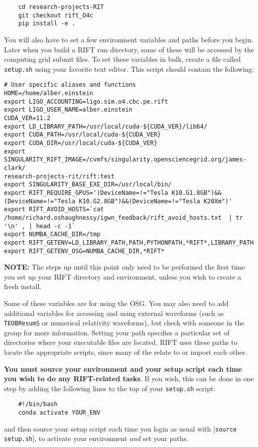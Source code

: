 \documentclass{article}
\begin{document}
\begin{verbatim}
    cd research-projects-RIT
    git checkout rift_O4c
    pip install -e .
\end{verbatim}

You will also have to set a few environment variables and paths before you begin. Later when you build a RIFT run directory, some of these will be accessed by the computing grid submit files. To set these variables in bulk, create a file called \texttt{setup.sh} using your favorite text editor. This script should contain the following:

\begin{verbatim}
# User specific aliases and functions 
HOME=/home/alber.einstein
export LIGO_ACCOUNTING=ligo.sim.o4.cbc.pe.rift
export LIGO_USER_NAME=alber.einstein
CUDA_VER=11.2
export LD_LIBRARY_PATH=/usr/local/cuda-${CUDA_VER}/lib64/
export CUDA_PATH=/usr/local/cuda-${CUDA_VER}
export CUDA_DIR=/usr/local/cuda-${CUDA_VER}
export SINGULARITY_RIFT_IMAGE=/cvmfs/singularity.opensciencegrid.org/james-clark/
research-projects-rit/rift:test
export SINGULARITY_BASE_EXE_DIR=/usr/local/bin/
export RIFT_REQUIRE_GPUS='(DeviceName=!="Tesla K10.G1.8GB")&&(DeviceName=!="Tesla K10.G2.8GB")&&(DeviceName=!="Tesla K20Xm")'
export RIFT_AVOID_HOSTS=`cat /home/richard.oshaughnessy/igwn_feedback/rift_avoid_hosts.txt  | tr '\n' , | head -c -1`
export NUMBA_CACHE_DIR=/tmp
export RIFT_GETENV=LD_LIBRARY_PATH,PATH,PYTHONPATH,*RIFT*,LIBRARY_PATH
export RIFT_GETENV_OSG=NUMBA_CACHE_DIR,*RIFT*
\end{verbatim}

\textbf{NOTE:} The steps up until this point only need to be performed the first time you set up your RIFT directory and environment, unless you wish to create a fresh install.

Some of these variables are for using the OSG. You may also need to add additional variables for accessing and using external waveforms (such as \texttt{TEOBResumS} or numerical relativity waveforms), but check with someone in the group for more information. 
Setting your path specifies a particular set of directories where your executable files are located. RIFT uses these paths to locate the appropriate scripts, since many of the relate to or import each other. 

\textbf{You must source your environment and your setup script each time you wish to do any RIFT-related tasks}. If you wish, this can be done in one step by adding the following lines to the top of your \texttt{setup.sh} script:

\begin{verbatim}
    #!/bin/bash
    conda activate YOUR_ENV
\end{verbatim}

and then source your setup script each time you login as usual with [\texttt{source setup.sh}], to activate your environment \textit{and} set your paths.
\end{document}
